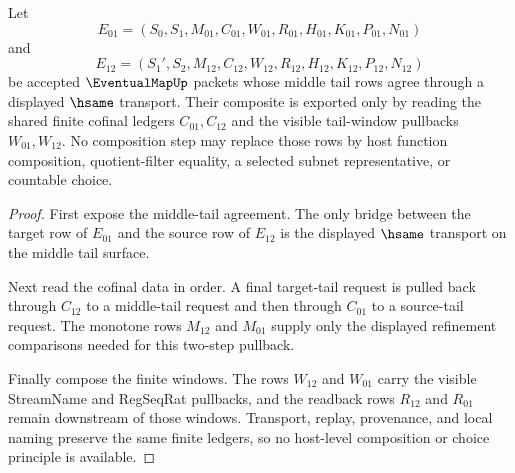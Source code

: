 \begin{theorem}
\label{thm:eventual-map-composition-handoff}
Let
$$
E_{01}=(S_0,S_1,M_{01},C_{01},W_{01},R_{01},H_{01},K_{01},P_{01},N_{01})
$$
and
$$
E_{12}=(S_1',S_2,M_{12},C_{12},W_{12},R_{12},H_{12},K_{12},P_{12},N_{12})
$$
be accepted $\EventualMapUp$ packets whose middle tail rows agree through a displayed $\hsame$ transport. Their composite is exported only by reading the shared finite cofinal ledgers $C_{01},C_{12}$ and the visible tail-window pullbacks $W_{01},W_{12}$. No composition step may replace those rows by host function composition, quotient-filter equality, a selected subnet representative, or countable choice.
\end{theorem}
\begin{proof}
First expose the middle-tail agreement. The only bridge between the target row of $E_{01}$ and the source row of $E_{12}$ is the displayed $\hsame$ transport on the middle tail surface.

Next read the cofinal data in order. A final target-tail request is pulled back through $C_{12}$ to a middle-tail request and then through $C_{01}$ to a source-tail request. The monotone rows $M_{12}$ and $M_{01}$ supply only the displayed refinement comparisons needed for this two-step pullback.

Finally compose the finite windows. The rows $W_{12}$ and $W_{01}$ carry the visible StreamName and RegSeqRat pullbacks, and the readback rows $R_{12}$ and $R_{01}$ remain downstream of those windows. Transport, replay, provenance, and local naming preserve the same finite ledgers, so no host-level composition or choice principle is available.
\end{proof}


\begin{closurestatus}{\EventualMapUp}
  \theoryclosure{\seedClosure}
  \formalstatus{\unformalizedV}
\end{closurestatus}
